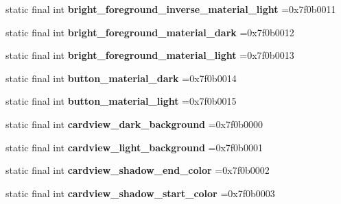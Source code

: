 \begin{DoxyCompactItemize}
static final int {\bfseries bright\+\_\+foreground\+\_\+inverse\+\_\+material\+\_\+light} =0x7f0b0011
\item 
\mbox{\label{classproject4_1_1xaria_1_1R_1_1color_abee6e7eaf8909d35e43adbe0196ed5f9}} 
static final int {\bfseries bright\+\_\+foreground\+\_\+material\+\_\+dark} =0x7f0b0012
\item 
\mbox{\label{classproject4_1_1xaria_1_1R_1_1color_a227379ae6825eb027cc6f72fd67d7217}} 
static final int {\bfseries bright\+\_\+foreground\+\_\+material\+\_\+light} =0x7f0b0013
\item 
\mbox{\label{classproject4_1_1xaria_1_1R_1_1color_a17e16cac8fb3717c6aa18c6e12be5573}} 
static final int {\bfseries button\+\_\+material\+\_\+dark} =0x7f0b0014
\item 
\mbox{\label{classproject4_1_1xaria_1_1R_1_1color_a059105f5b2d98717df8658e87577f3b1}} 
static final int {\bfseries button\+\_\+material\+\_\+light} =0x7f0b0015
\item 
\mbox{\label{classproject4_1_1xaria_1_1R_1_1color_a44dfdfb629fa5ba1680b857776b8ee7a}} 
static final int {\bfseries cardview\+\_\+dark\+\_\+background} =0x7f0b0000
\item 
\mbox{\label{classproject4_1_1xaria_1_1R_1_1color_a19b5fb2ea81e1a3e1afc3da0089c1ed5}} 
static final int {\bfseries cardview\+\_\+light\+\_\+background} =0x7f0b0001
\item 
\mbox{\label{classproject4_1_1xaria_1_1R_1_1color_a7aec829a1ea97cb387cf9ecf1f0b3d60}} 
static final int {\bfseries cardview\+\_\+shadow\+\_\+end\+\_\+color} =0x7f0b0002
\item 
\mbox{\label{classproject4_1_1xaria_1_1R_1_1color_a936e7bb02d6c98a3f501bde949982505}} 
static final int {\bfseries cardview\+\_\+shadow\+\_\+start\+\_\+color} =0x7f0b0003
\item 
\mbox{\label{classproject4_1_1xaria_1_1R_1_1color_afd49d0867da2c2891c3a5cae1d410eda}} 

\end{DoxyCompactItemize}
